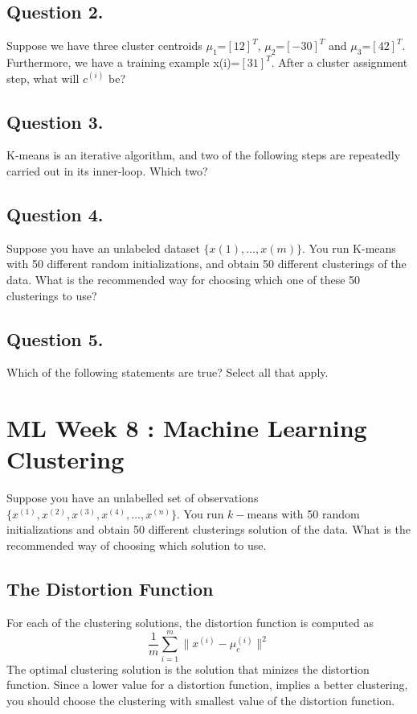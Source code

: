 \documentclass[11pt]{article} %
\begin{document}
\subsection*{Question 2.} 
Suppose we have three cluster centroids $\mu_1$=$[1 2]^T$, $\mu_2$=$[-3 0]^T$ and $\mu_3$=$[4 2]^T$. 
Furthermore, we have a training example x(i)=$[3 1]^T$. After a cluster assignment step, what will $c^{(i)}$ be?


\subsection*{Question 3.}
K-means is an iterative algorithm, and two of the following steps are repeatedly carried out in its inner-loop. Which two?


\subsection*{Question 4. }
Suppose you have an unlabeled dataset $\{x(1),\ldots,x(m)\}$. You run K-means with 50 different random
initializations, and obtain 50 different clusterings of the data. 
What is the recommended way for choosing which one of these 50 clusterings to use?

\subsection*{Question 5. }
Which of the following statements are true? Select all that apply.


\newpage
\section{ML Week 8 : Machine Learning Clustering}

Suppose you have an unlabelled set of observations$\{ x^{(1)},x^{(2)},x^{(3)},x^{(4)}, \ldots ,x^{(n)}\}$.
You run $k-$means with 50 random initializations and obtain 50 different clusterings solution of the data.
What is the recommended way of choosing which solution to use.

\subsection{The Distortion Function}
For each of the clustering solutions, the distortion function is computed as 
\[ \frac{1}{m} \sum^{m}_{i=1} \parallel x^{(i)} - \mu_c^{(i)}\parallel ^2 \]
The optimal clustering solution is the solution that minizes the distortion function.
Since a lower value for a distortion function, implies a better clustering, you should choose the clustering with 
smallest value of the distortion function.
\end{document}
